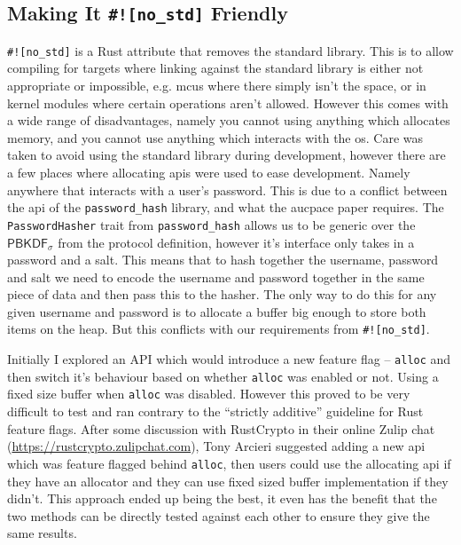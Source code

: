 \subsection{Making It \texttt{\#![no\_std]} Friendly}
\verb|#![no_std]| is a Rust attribute that removes the standard library.
This is to allow compiling for targets where linking against the standard library is either not appropriate or impossible, e.g. \glspl{mcu} where there simply isn't the space, or in kernel modules where certain operations aren't allowed.
However this comes with a wide range of disadvantages, namely you cannot using anything which allocates memory, and you cannot use anything which interacts with the \gls{os}.
Care was taken to avoid using the standard library during development, however there are a few places where allocating \glspl{api} were used to ease development.
Namely anywhere that interacts with a user's password.
This is due to a conflict between the \gls{api} of the \texttt{password\_hash} library, and what the \gls{aucpace} paper requires.
The \texttt{PasswordHasher} trait from \texttt{password\_hash} allows us to be generic over the $\textsf{PBKDF}_{\sigma}$ from the protocol definition, however it's interface only takes in a password and a salt.
This means that to hash together the username, password and salt we need to encode the username and password together in the same piece of data and then pass this to the hasher.
The only way to do this for any given username and password is to allocate a buffer big enough to store both items on the heap.
But this conflicts with our requirements from \verb|#![no_std]|.

Initially I explored an API which would introduce a new feature flag -- \texttt{alloc} and then switch it's behaviour based on whether \texttt{alloc} was enabled or not.
Using a fixed size buffer when \texttt{alloc} was disabled.
However this proved to be very difficult to test and ran contrary to the \enquote{strictly additive} guideline for Rust feature flags.
After some discussion with RustCrypto in their online Zulip chat (\url{https://rustcrypto.zulipchat.com}), Tony Arcieri
suggested adding a new \gls{api} which was feature flagged behind \texttt{alloc}, then users could use the allocating \gls{api} if they have an allocator and they can use fixed sized buffer implementation if they didn't.
This approach ended up being the best, it even has the benefit that the two methods can be directly tested against each other to ensure they give the same results.

